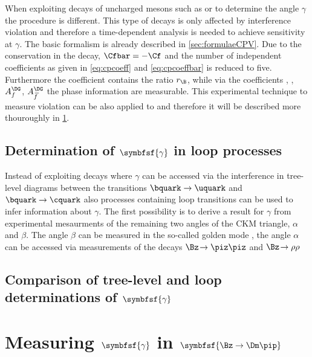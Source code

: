 When exploiting decays of uncharged \B mesons such as \BsToDsK or \BdToDpi to determine the angle $\gamma$ the procedure is different.
This type of decays is only affected by interference \CP violation and therefore a time-dependent analysis is needed to achieve sensitivity at $\gamma$.
The basic formalism is already described in \cref{sec:formulaeCPV}.
Due to the \CP conservation in the decay, $\Cfbar=-\Cf$ and the number of independent coefficients as given in \cref{eq:cpcoeff} and \cref{eq:cpcoeffbar} is reduced to five.
Furthermore the \CP coefficient \Cf contains the ratio $r_\B$, while via the coefficients \Sf, \Sfbar, $A_f^{\DG}$, $A_{\kern 1.5pt\overline{\kern -1.5pt f\kern 1.5pt}}^{\DG}$ the phase information are measurable.
This experimental technique to measure \CP violation can be also applied to \BdToDpi and therefore it will be described more thouroughly in \cref{sec:GammaInBd2Dpi}.

\subsection[head={Determination of $\gamma$ in loop processes},tocentry={Determination of $\gamma$ in loop processes}]{Determination of $\symbfsf{\gamma}$ in loop processes}
\label{sec:gamamInLoops}
Instead of exploiting decays where $\gamma$ can be accessed via the interference in tree-level diagrams between the transitions $\bquark\to\uquark$ and $\bquark\to\cquark$ also processes containing loop transitions can be used to infer information about $\gamma$.
The first possibility is to derive a result for $\gamma$ from experimental mesaurments of the remaining two angles of the CKM triangle, $\alpha$ and $\beta$.
The angle $\beta$ can be measured in the so-called golden mode \BdToJPsiKS, the angle $\alpha$ can be accessed via measurements of the decays $\Bz\!\to\piz\piz$ and $\Bz\!\to\rho\rho$

\subsection[head={Comparison of tree-level and loop determinations of $\gamma$},tocentry={Comparison of tree-level and loop determinations of $\gamma$}]{Comparison of tree-level and loop determinations of $\symbfsf{\gamma}$}

\section[head={Measuring $\gamma$ in $\Bz\to\Dm\pip$},tocentry={Measuring $\gamma$ in $\Bz\to\Dm\pip$}]{Measuring $\symbfsf{\gamma}$ in $\symbfsf{\Bz\to\Dm\pip}$}
\label{sec:GammaInBd2Dpi}
